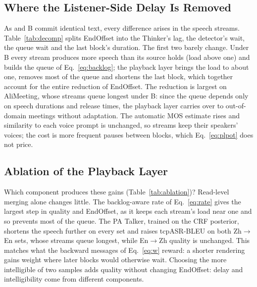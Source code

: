 

\subsection{Where the Listener-Side Delay Is Removed}
\label{sec:res-delay}

As \sys{} and B commit identical text, every difference arises in the speech streams. Table~\ref{tab:decomp} splits
EndOffset into the Thinker's lag, the detector's wait, the queue wait and the last block's duration. The first two
barely change. Under B every stream produces more speech than its source holds (load above one) and builds the queue
of Eq.~\eqref{eq:backlog}; the playback layer brings the load to about one, removes most of the queue and shortens the
last block, which together account for the entire reduction of EndOffset. The reduction is largest on AliMeeting,
whose streams queue longest under B: since the queue depends only on speech durations and release times, the playback
layer carries over to out-of-domain meetings without adaptation. The automatic MOS estimate rises and similarity to
each voice prompt is unchanged, so streams keep their speakers' voices; the cost is more frequent pauses between
blocks, which Eq.~\eqref{eq:plpot} does not price.



\subsection{Ablation of the Playback Layer}
\label{sec:res-ablation}

Which component produces these gains (Table~\ref{tab:ablation})? Read-level merging alone changes little. The
backlog-aware rate of Eq.~\eqref{eq:rate} gives the largest step in quality and EndOffset, as it keeps each stream's
load near one and so prevents most of the queue. The PA Talker, trained on the CRF posterior, shortens the speech
further on every set and raises tcpASR-BLEU on both Zh$\rightarrow$En sets, whose streams queue longest, while
En$\rightarrow$Zh quality is unchanged. This matches what the backward messages of Eq.~\eqref{eq:w} reward: a shorter
rendering gains weight where later blocks would otherwise wait. Choosing the more intelligible of two samples adds
quality without changing EndOffset: delay and intelligibility come from different components.



